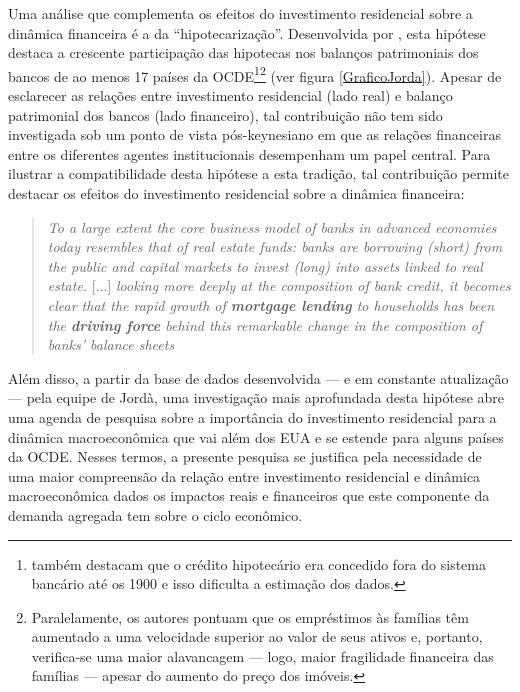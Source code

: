 Uma análise que complementa os efeitos do investimento residencial sobre a dinâmica financeira é a da ``hipotecarização''. 
Desenvolvida por \textcite{jorda_great_2014}, esta hipótese destaca a crescente participação das hipotecas nos balanços patrimoniais dos bancos de ao menos 17 países da OCDE\footnote{\textcite{jorda_great_2014} também destacam que o crédito hipotecário era concedido fora do sistema bancário até os 1900 e isso dificulta a estimação dos dados.}\footnote{Paralelamente, os autores pontuam que os empréstimos às famílias têm aumentado a uma velocidade superior ao valor de seus ativos e, portanto, verifica-se uma maior alavancagem --- logo, maior fragilidade financeira das famílias --- apesar do aumento do preço dos imóveis.} (ver figura \ref{GraficoJorda}).
Apesar de esclarecer as relações entre investimento residencial (lado real) e balanço patrimonial dos bancos (lado financeiro), tal contribuição não tem sido investigada sob um ponto de vista pós-keynesiano em que as relações financeiras entre os diferentes agentes institucionais desempenham um papel central. Para ilustrar a compatibilidade desta hipótese a esta tradição, tal contribuição permite destacar os efeitos do investimento residencial sobre a dinâmica financeira: 

\begin{quote}
	\textit{To a large extent the core business model of banks in advanced economies today resembles that of real estate funds: banks are borrowing (short) from the public and capital markets to invest (long) into assets linked to real estate.} [...] \textit{looking more deeply at the composition of bank credit, it becomes clear that the rapid growth of \textbf{mortgage lending} to households has been the \textbf{driving force} behind this remarkable change in the composition of banks’ balance sheets} \cite[p.~2, grifos adicionados]{jorda_great_2014}
\end{quote}
Além disso, a partir da base de dados desenvolvida --- e em constante atualização --- pela equipe de Jordà, uma investigação mais aprofundada desta hipótese abre uma agenda de pesquisa sobre a importância do investimento residencial para a dinâmica macroeconômica que vai além dos EUA e se estende para alguns países da OCDE. Nesses termos, a presente pesquisa se justifica pela necessidade de uma maior compreensão 
da relação entre investimento residencial e dinâmica macroeconômica dados os impactos reais e financeiros que este componente da demanda agregada tem sobre o ciclo econômico. 

